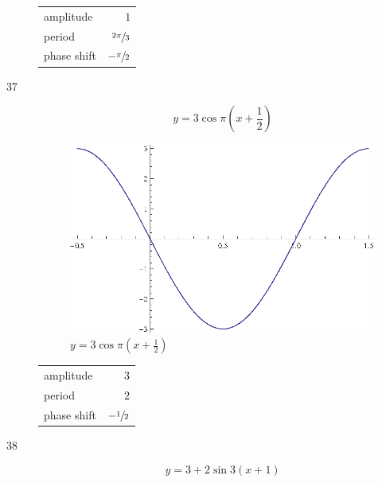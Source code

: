 \documentclass{exam}
\begin{document}
\begin{description}
        \begin{tabular}[H]{lr}
          \toprule
          amplitude   & $1$ \\
          period      & $\sfrac{2 \pi}{3}$ \\
          phase shift & $- \sfrac{\pi}{2}$ \\
          \bottomrule
        \end{tabular}

      \pagebreak

      \item[37]
        \[
          y = 3 \cos \pi \left( x + \frac{1}{2} \right) 
        \]

        \begin{figure}[H]
          \centering
          \includegraphics[scale=1.0]{exercise37.eps}
          \caption{$y = 3 \cos \pi \left( x + \frac{1}{2} \right)$}
        \end{figure}

        \begin{tabular}[H]{lr}
          \toprule
          amplitude   & $3$ \\
          period      & $2$ \\
          phase shift & $- \sfrac{1}{2}$ \\
          \bottomrule
        \end{tabular}

      \pagebreak

      \item[38]
        \[
          y = 3 + 2 \sin 3 \left( x + 1 \right) 
        \]


\end{description}
\end{document}
